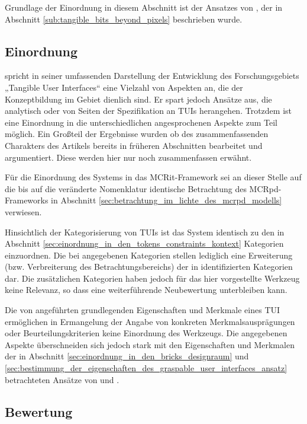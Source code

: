 Grundlage der Einordnung in diesem Abschnitt ist der Ansatzes von \citep{Ishii08}, der in Abschnitt \ref{sub:tangible_bits_beyond_pixels} beschrieben wurde.

\subsection{Einordnung}

\citet{Ishii08} spricht in seiner umfassenden Darstellung der Entwicklung des Forschungsgebiets „Tangible User Interfaces“ eine Vielzahl von Aspekten an, die der Konzeptbildung im Gebiet dienlich sind. Er spart jedoch Ansätze aus, die analytisch oder von Seiten der Spezifikation an \glspl{TUI} herangehen. Trotzdem ist eine Einordnung in die unterschiedlichen angesprochenen Aspekte zum Teil möglich. Ein Großteil der Ergebnisse wurden ob des zusammenfassenden Charakters des Artikels bereits in früheren Abschnitten bearbeitet und argumentiert. Diese werden hier nur noch zusammenfassen erwähnt.

Für die Einordnung des Systems in das \gls{MCRit}-Framework sei an dieser Stelle auf die bis auf die veränderte Nomenklatur identische Betrachtung des \gls{MCRpd}-Frameworks in Abschnitt \ref{sec:betrachtung_im_lichte_des_mcrpd_modells} verwiesen.

Hinsichtlich der Kategorisierung von \glspl{TUI} ist das System identisch zu den in Abschnitt \ref{sec:einordnung_in_den_tokens_constraints_kontext} Kategorien einzuordnen. Die bei \citep{Ishii08} angegebenen Kategorien stellen lediglich eine Erweiterung (bzw. Verbreiterung des Betrachtungsbereichs) der in \citep{Ullmer05} identifizierten Kategorien dar. Die zusätzlichen Kategorien haben jedoch für das hier vorgestellte Werkzeug keine Relevanz, so dass eine weiterführende Neubewertung unterbleiben kann.

Die von \citeauthor{Ishii08} angeführten grundlegenden Eigenschaften und Merkmale eines \gls{TUI} ermöglichen in Ermangelung der Angabe von konkreten Merkmalsausprägungen oder Beurteilungskriterien keine Einordnung des Werkzeugs. Die angegebenen Aspekte überschneiden sich jedoch stark mit den Eigenschaften und Merkmalen der in Abschnitt \ref{sec:einordnung_in_den_bricks_designraum} und \ref{sec:bestimmung_der_eigenschaften_des_graspable_user_interfaces_ansatz} betrachteten Ansätze von \citep{Fitzmaurice95} und \citep{Fitzmaurice96}.

\subsection{Bewertung}

